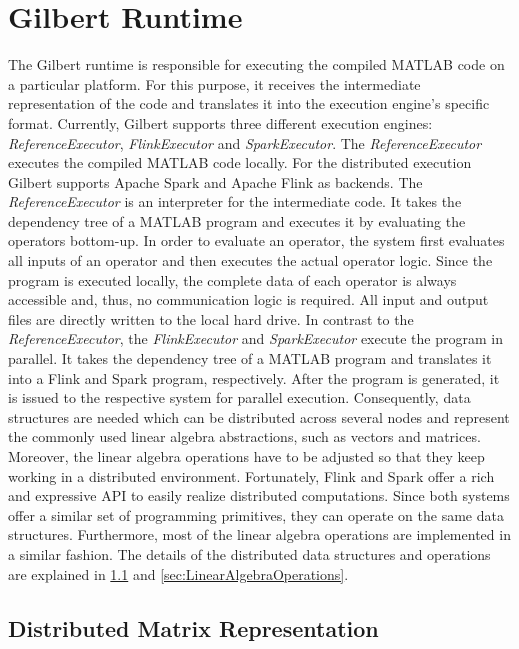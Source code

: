 \section{Gilbert Runtime}
\label{sec:gilbertRuntime}

The Gilbert runtime is responsible for executing the compiled MATLAB code on a particular platform. For this purpose, it receives the intermediate representation of the code and translates it into the execution engine's specific format. Currently, Gilbert supports three different execution engines: \emph{ReferenceExecutor}, \emph{FlinkExecutor} and \emph{SparkExecutor}. The \emph{ReferenceExecutor} executes the compiled MATLAB code locally. For the distributed execution Gilbert supports Apache Spark and Apache Flink as backends. The \emph{ReferenceExecutor} is an interpreter for the intermediate code.
It takes the dependency tree of a MATLAB program and executes it by evaluating the operators bottom-up. In order to evaluate an operator, the system first evaluates all inputs of an operator and then executes the actual operator logic. Since the program is executed locally, the complete data of each operator is always accessible and, thus, no communication logic is required. 
All input and output files are directly written to the local hard drive. 
In contrast to the \emph{ReferenceExecutor}, the \emph{FlinkExecutor} and \emph{SparkExecutor} execute the program in parallel. 
It takes the dependency tree of a MATLAB program and translates it into a Flink and Spark program, respectively. 
After the program is generated, it is issued to the respective system for parallel execution. 
Consequently, data structures are needed which can be distributed across several nodes and represent the commonly used linear algebra abstractions, such as vectors and matrices. 
Moreover, the linear algebra operations have to be adjusted so that they keep working in a distributed environment. 
Fortunately, Flink and Spark offer a rich and expressive API to easily realize distributed computations.
Since both systems offer a similar set of programming primitives, they can operate on the same data structures. 
Furthermore, most of the linear algebra operations are implemented in a similar fashion.
The details of the distributed data structures and operations are explained in \cref{sec:DistributedMatrixRepresentation} and \cref{sec:LinearAlgebraOperations}.

\subsection{Distributed Matrix Representation}
\label{sec:DistributedMatrixRepresentation}


